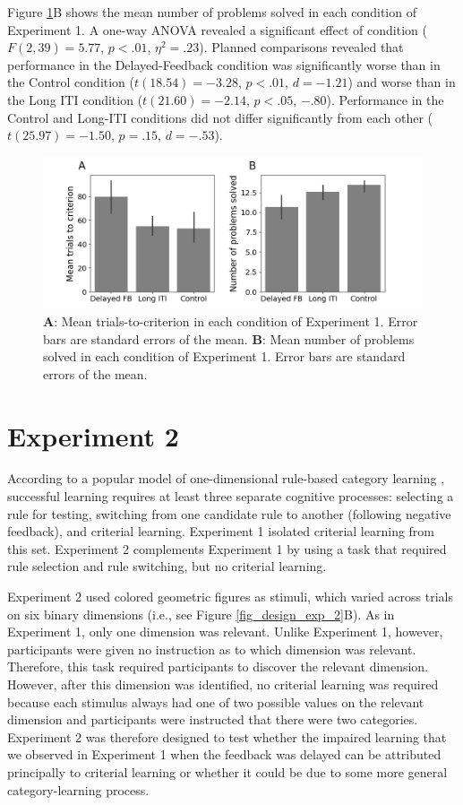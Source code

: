 \documentclass[doc, floatsintext]{apa7}
\begin{document}
Figure \ref{fig_exp_1_t2c}B shows the mean number of
problems solved in each condition of Experiment 1. A one-way
ANOVA revealed a significant effect of condition ($F(2, 39)
= 5.77$, $p < .01$, $\eta^2 = .23$). Planned comparisons
revealed that performance in the Delayed-Feedback condition
was significantly worse than in the Control condition
($t(18.54) = -3.28$, $p < .01$, $d=-1.21$) and worse than in
the Long ITI condition ($t(21.60) = -2.14$, $p < .05$,
$-.80$).  Performance in the Control and Long-ITI conditions
did not differ significantly from each other ($t(25.97) =
-1.50$, $p=.15$, $d=-.53$).

\begin{figure}
  \centering
  \includegraphics[width=.8\textwidth]{../figures/fig_exp_1_t2c.png}
    \caption{
        \textbf{A}: Mean trials-to-criterion in each
        condition of Experiment 1. Error bars are standard
        errors of the mean.
        \textbf{B}: Mean number of problems solved in each
        condition of Experiment 1. Error bars are standard
        errors of the mean.
}
  \label{fig_exp_1_t2c}
\end{figure}

\section{Experiment 2}
According to a popular model of one-dimensional rule-based
category learning \parencite[i.e.,
COVIS;][]{AshbyCOVIS1998}, successful learning requires at
least three separate cognitive processes: selecting a rule
for testing, switching from one candidate rule to another
(following negative feedback), and criterial learning.
Experiment 1 isolated criterial learning from this set.
Experiment 2 complements Experiment 1 by using a task that
required rule selection and rule switching, but no criterial
learning. 

Experiment 2 used colored geometric figures as stimuli,
which varied across trials on six binary dimensions (i.e.,
see Figure \ref{fig_design_exp_2}B). As in Experiment 1,
only one dimension was relevant. Unlike Experiment 1,
however, participants were given no instruction as to which
dimension was relevant. Therefore, this task required
participants to discover the relevant dimension. However,
after this dimension was identified, no criterial learning
was required because each stimulus always had one of two
possible values on the relevant dimension and participants
were instructed that there were two categories. Experiment 2
was therefore designed to test whether the impaired learning
that we observed in Experiment 1 when the feedback was
delayed can be attributed principally to criterial learning
or whether it could be due to some more general
category-learning process.
\end{document}

